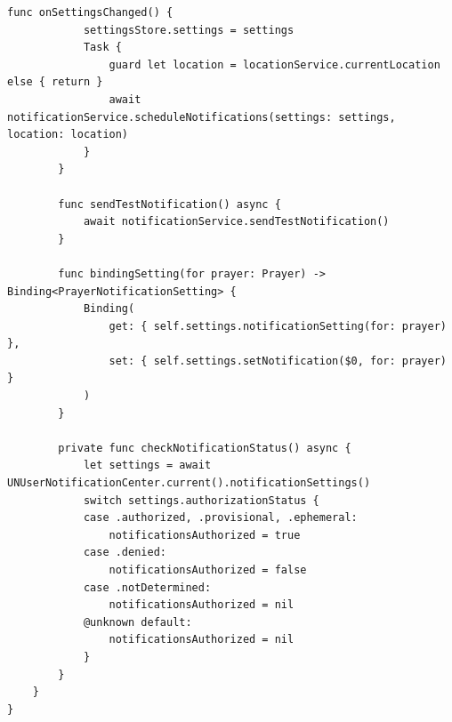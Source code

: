\begin{lstlisting}[basicstyle=\tiny\ttfamily,breaklines=true]
        func onSettingsChanged() {
            settingsStore.settings = settings
            Task {
                guard let location = locationService.currentLocation else { return }
                await notificationService.scheduleNotifications(settings: settings, location: location)
            }
        }

        func sendTestNotification() async {
            await notificationService.sendTestNotification()
        }

        func bindingSetting(for prayer: Prayer) -> Binding<PrayerNotificationSetting> {
            Binding(
                get: { self.settings.notificationSetting(for: prayer) },
                set: { self.settings.setNotification($0, for: prayer) }
            )
        }

        private func checkNotificationStatus() async {
            let settings = await UNUserNotificationCenter.current().notificationSettings()
            switch settings.authorizationStatus {
            case .authorized, .provisional, .ephemeral:
                notificationsAuthorized = true
            case .denied:
                notificationsAuthorized = false
            case .notDetermined:
                notificationsAuthorized = nil
            @unknown default:
                notificationsAuthorized = nil
            }
        }
    }
}
\end{lstlisting}


